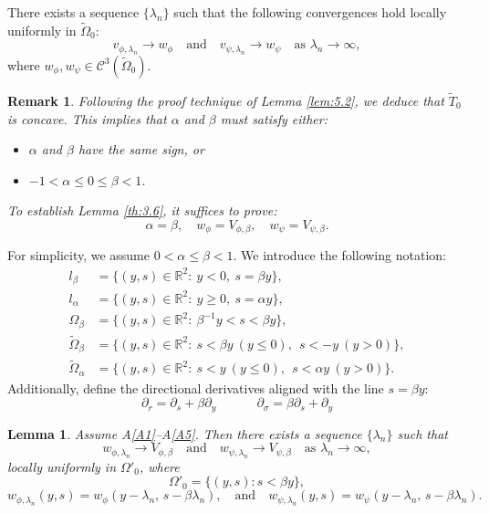 \documentclass[
  sn-mathphys-num,
  colorlinks,
  linkcolor=darkmagenta,
  citecolor=rufous,
  urlcolor=zaffre,
  hypertexnames=false
]{sn-jnl}
\numberwithin{equation}{section}
\newtheorem{lemma}[theorem]{Lemma}%
\newtheorem{remark}[theorem]{Remark}%
\begin{document}
There exists a sequence $\{\lambda_n\}$ such that the following convergences hold locally uniformly in $\tilde{\Omega}_0$:
$$
v_{\phi,\lambda_n} \to w_\phi \quad \text{and} \quad v_{\psi,\lambda_n} \to w_\psi \quad \text{as } \lambda_n \to \infty,
$$
where $w_\phi, w_\psi \in \mathcal{C}^3(\tilde{\Omega}_0)$. 
\begin{remark}
Following the proof technique of Lemma \ref{lem:5.2}, we deduce that $\tilde{T}_0$ is concave. This implies that $\alpha$ and $\beta$ must satisfy either:
\begin{itemize}
\item $\alpha$ and $\beta$ have the same sign, or
\item $-1 < \alpha \leq 0 \leq \beta < 1$.
\end{itemize}
To establish Lemma \ref{th:3.6}, it suffices to prove:
\begin{equation}\label{7.7}
\alpha = \beta, \quad w_\phi = V_{\phi, \beta}, \quad w_\psi = V_{\psi, \beta}.
\end{equation}
\end{remark}
For simplicity, we assume $0 < \alpha \leq \beta < 1$. We introduce the following notation:
\begin{equation}\label{ob}
    \begin{aligned}
l_\beta &= \{(y,s)\in\mathbb{R}^2:\ y<0,\ s=\beta y\},\\
l_\alpha &= \{(y,s)\in\mathbb{R}^2:\ y\ge 0,\ s=\alpha y\},\\
\Omega_\beta &= \{(y,s)\in\mathbb{R}^2:\ \beta^{-1}y < s < \beta y\},\\
\tilde{\Omega}_\beta &= \{(y,s)\in\mathbb{R}^2:\ s<\beta y\ (y\le 0),\ \ s<-y\ (y>0)\},\\
\tilde{\Omega}_\alpha &= \{(y,s)\in\mathbb{R}^2:\ s<y\ (y\le 0),\ \ s<\alpha y\ (y>0)\}.
 \end{aligned}
\end{equation}
Additionally, define the directional derivatives aligned with the line $s=\beta y$:
$$
\partial_r = \partial_s + \beta \partial_y \quad \, 
\qquad 
\partial_\sigma = \beta \partial_s + \partial_y
$$
\begin{lemma}\label{lem5.5}
Assume A\ref{A1}--A\ref{A5}. Then there exists a sequence $\{\lambda_n\}$ such that 
$$
w_{\phi, \lambda_n} \to V_{\phi, \beta} \quad \text{and} \quad w_{\psi, \lambda_n} \to V_{\psi, \beta} \quad \text{as } \lambda_n \to \infty,
$$
locally uniformly in $\Omega'_0$, where 
$$
\Omega'_0 = \{(y, s) : s < \beta y\},
$$
$$
w_{\phi, \lambda_n}(y, s) = w_\phi(y - \lambda_n,\, s - \beta \lambda_n), \quad \text{and} \quad
w_{\psi, \lambda_n}(y, s) = w_\psi(y - \lambda_n,\, s - \beta \lambda_n).
$$
\end{lemma}
\end{document}
